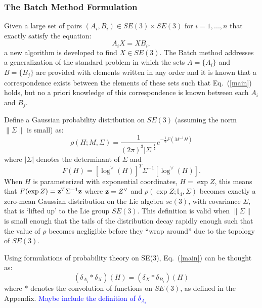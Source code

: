 \documentclass[twocolumn,10pt]{asme2ej}
\newcommand{\half}{\frac{1}{2}}
\begin{document}
\subsubsection{The Batch Method Formulation}
Given a large set of pairs $(A_i,B_i) \in SE(3) \times SE(3)$ for $i =1,...,n$ that exactly satisfy the equation:
\begin{equation} A_i X = X B_i , \label{main} \end{equation}
a new algorithm is developed to find $X \in SE(3)$. The Batch method addresses a generalization of the standard problem in which
the sets $A=\{A_i\}$ and $B =\{B_j\}$ are provided with elements written in any order and it is known that a correspondence exists between the elements of these sets such that Eq.~(\ref{main}) holds, but no a priori knowledge of this correspondence is known between each $A_i$ and $B_j$.

Define a Gaussian probability distribution on $SE(3)$ (assuming the norm $\|\Sigma\|$ is small) as:
$$ \rho(H; M, \Sigma) = \frac{1}{(2\pi)^3 |\Sigma|^{\half}} e^{-\half F(M^{-1} H)} $$
where $|\Sigma|$ denotes the determinant of $\Sigma$ and
$$ F(H) = [\log^{\vee}(H)]^T \Sigma^{-1} [\log^{\vee}(H)]. $$
When $H$ is parameterized with exponential coordinates, $H = \exp Z$, this means that
$F(\exp Z) = {\bf z}^T \Sigma^{-1}  {\bf z}$ where ${\bf z} = Z^{\vee}$ and
$\rho(\exp Z; \mathbb{I}_4, \Sigma)$ becomes exactly a zero-mean Gaussian distribution on the Lie algebra $se(3)$, with covariance $\Sigma$, that is `lifted up' to the Lie group $SE(3)$. This definition is valid when $\|\Sigma\|$ is small enough that the tails of the distribution decay rapidly enough such that the value of $\rho$
becomes negligible before they ``wrap around'' due to the topology of $SE(3)$. 

Using formulations of probability theory on SE(3), Eq.~(\ref{main}) can be thought as:
\begin{equation} (\delta_{A_i} * \delta_X)(H) = (\delta_X * \delta_{B_i})(H) \label{mainconv} \end{equation}
where $*$ denotes the convolution of functions on $SE(3)$, as defined in the Appendix.
\textcolor{blue}{Maybe include the definition of $ \delta_{A_i}$}

\end{document}
